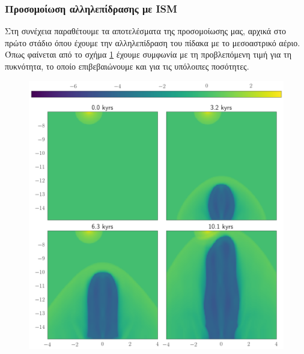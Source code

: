 \subsubsection{Προσομοίωση αλληλεπίδρασης με ISM}
	Στη συνέχεια παραθέτουμε τα αποτελέσματα της προσομοίωσης μας, αρχικά στο πρώτο στάδιο όπου έχουμε την αλληλεπίδραση του πίδακα με το μεσοαστρικό αέριο. Όπως φαίνεται από το σχήμα \ref{fig:rhonocool} έχουμε συμφωνία με τη προβλεπόμενη τιμή για τη πυκνότητα, το οποίο επιβεβαιώνουμε και για τις υπόλοιπες ποσότητες.
	
	
\begin{figure}[h]
	\centering
	\includegraphics[width=1\linewidth]{DataImages/RHOnoCool}
	\caption{}
	\label{fig:rhonocool}
\end{figure}

